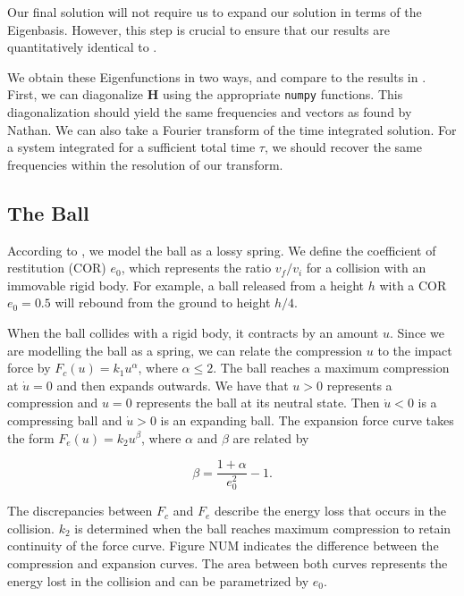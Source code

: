 \documentclass[linenumbers]{aastex7}
\begin{document}
Our final solution will not require us to expand our solution in terms of the Eigenbasis. However, this step is crucial to ensure that our results are quantitatively identical to \citet{nathanDynamicsBaseballBat2000a}.

We obtain these Eigenfunctions in two ways, and compare to the results in \citet{nathanDynamicsBaseballBat2000a}. First, we can diagonalize $\mathbf{H}$ using the appropriate \verb|numpy| functions. This diagonalization should yield the same frequencies and vectors as found by Nathan. We can also take a Fourier transform of the time integrated solution. For a system integrated for a sufficient total time $\tau$, we should recover the same frequencies within the resolution of our transform.

\subsection{The Ball}
According to \citet{nathanDynamicsBaseballBat2000a}, we model the ball as a lossy spring. We define the coefficient of restitution (COR) $e_0$, which represents the ratio $v_f/v_i$ for a collision with an immovable rigid body. For example, a ball released from a height $h$ with a COR $e_0 = 0.5$ will rebound from the ground to height $h/4$. 

When the ball collides with a rigid body, it contracts by an amount $u$. Since we are modelling the ball as a spring, we can relate the compression $u$ to the impact force by $F_c(u) = k_1 u^\alpha$, where $\alpha \leq 2$. The ball reaches a maximum compression at $\dot{u} = 0$ and then expands outwards. We have that $u > 0$ represents a compression and $u = 0$ represents the ball at its 
neutral state. Then $\dot{u} < 0$ is a compressing ball and $\dot{u} > 0$ is an expanding ball. The expansion force curve takes the form $F_e(u) = k_2 u^\beta$, where $\alpha$ and $\beta$ are related by

\begin{equation}\label{eq:beta}
    \beta = \frac{1 + \alpha}{e_0^2} - 1.
\end{equation}

The discrepancies between $F_c$ and $F_e$ describe the energy loss that occurs in the collision. $k_2$ is determined when the ball reaches maximum compression to retain continuity of the force curve. Figure NUM indicates the difference between the compression and expansion curves. The area between both curves represents the energy lost in the collision and can be parametrized by $e_0$.
\end{document}
